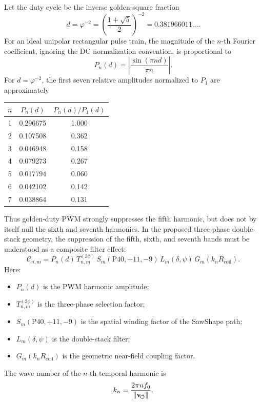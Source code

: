 Let the duty cycle be the inverse golden-square fraction
\begin{equation}
d = \varphi^{-2}
=
\left(\frac{1+\sqrt{5}}{2}\right)^{-2}
=
0.381966011\ldots .
\end{equation}
For an ideal unipolar rectangular pulse train, the magnitude of the $n$-th Fourier coefficient, ignoring the DC normalization convention, is proportional to
\begin{equation}
P_n(d)
=
\left|
\frac{\sin(\pi n d)}{\pi n}
\right|.
\label{eq:appendix_pwm_spectrum}
\end{equation}
For $d=\varphi^{-2}$, the first seven relative amplitudes normalized to $P_1$ are approximately
\begin{center}
\begin{tabular}{c|c|c}
\hline
$n$ & $P_n(d)$ & $P_n(d)/P_1(d)$ \\
\hline
1 & 0.296675 & 1.000 \\
2 & 0.107508 & 0.362 \\
3 & 0.046948 & 0.158 \\
4 & 0.079273 & 0.267 \\
5 & 0.017794 & 0.060 \\
6 & 0.042102 & 0.142 \\
7 & 0.038864 & 0.131 \\
\hline
\end{tabular}
\end{center}
Thus golden-duty PWM strongly suppresses the fifth harmonic, but does not by itself null the sixth and seventh harmonics. In the proposed three-phase double-stack geometry, the suppression of the fifth, sixth, and seventh bands must be understood as a composite filter effect:
\begin{equation}
\boxed{
\mathcal{C}_{n,m}
=
P_n(d)\,
T_{n,m}^{(3\phi)}\,
S_m(\mathrm{P40},+11,-9)\,
L_m(\delta,\psi)\,
G_m(k_nR_{\mathrm{coil}})
}.
\label{eq:appendix_composite_filter}
\end{equation}
Here:
\begin{itemize}
\item $P_n(d)$ is the PWM harmonic amplitude;
\item $T_{n,m}^{(3\phi)}$ is the three-phase selection factor;
\item $S_m(\mathrm{P40},+11,-9)$ is the spatial winding factor of the SawShape path;
\item $L_m(\delta,\psi)$ is the double-stack filter;
\item $G_m(k_nR_{\mathrm{coil}})$ is the geometric near-field coupling factor.
\end{itemize}
The wave number of the $n$-th temporal harmonic is
\begin{equation}
k_n
=
\frac{2\pi n f_0}{\lVert\mathbf{v}_{\!\boldsymbol{\circlearrowleft}}\rVert}.
\end{equation}

